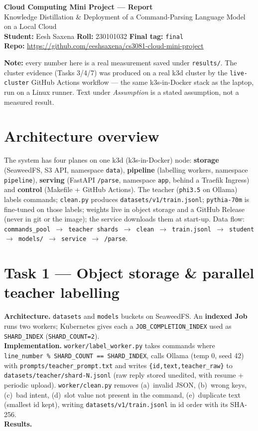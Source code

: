 \documentclass[10pt,a4paper]{article}
\newcommand{\code}[1]{\texttt{\small #1}}
\begin{document}
\begin{center}
  {\LARGE\bfseries Cloud Computing Mini Project --- Report}\\[2pt]
  {\normalsize Knowledge Distillation \& Deployment of a Command-Parsing Language Model on a Local Cloud}\\[6pt]
  \textbf{Student:} Eesh Saxena \quad\textbf{Roll:} 230101032 \quad\textbf{Final tag:} \code{final}\\[2pt]
  \textbf{Repo:} \url{https://github.com/eeshsaxena/cs3081-cloud-mini-project}
\end{center}

\noindent\colorbox{gray!12}{\parbox{\dimexpr\textwidth-2\fboxsep\relax}{\small
\textbf{Note:} every number here is a real measurement saved under \code{results/}. The cluster evidence
(Tasks 3/4/7) was produced on a real k3d cluster by the \code{live-cluster} GitHub Actions workflow --- the
same k3s-in-Docker stack as the laptop, run on a Linux runner. Text under \textit{Assumption} is a stated
assumption, not a measured result.}}

\section{Architecture overview}
The system has four planes on one k3d (k3s-in-Docker) node: \textbf{storage} (SeaweedFS, S3 API, namespace
\code{data}), \textbf{pipeline} (labelling workers, namespace \code{pipeline}), \textbf{serving} (FastAPI
\code{/parse}, namespace \code{app}, behind a Traefik Ingress) and \textbf{control} (Makefile + GitHub
Actions). The teacher (\code{phi3.5} on Ollama) labels commands; \code{clean.py} produces
\code{datasets/v1/train.jsonl}; \code{pythia-70m} is fine-tuned on those labels; weights live in object
storage and a GitHub Release (never in git or the image); the service downloads them at start-up. Data flow:
\code{commands\_pool $\rightarrow$ teacher shards $\rightarrow$ clean $\rightarrow$ train.jsonl $\rightarrow$
student $\rightarrow$ models/ $\rightarrow$ service $\rightarrow$ /parse}.

\section{Task 1 --- Object storage \& parallel teacher labelling}
\textbf{Architecture.} \code{datasets} and \code{models} buckets on SeaweedFS. An \textbf{indexed Job} runs
two workers; Kubernetes gives each a \code{JOB\_COMPLETION\_INDEX} used as \code{SHARD\_INDEX}
(\code{SHARD\_COUNT=2}).\\
\textbf{Implementation.} \code{worker/label\_worker.py} takes commands where
\code{line\_number \% SHARD\_COUNT == SHARD\_INDEX}, calls Ollama (temp 0, seed 42) with
\code{prompts/teacher\_prompt.txt} and writes \code{\{id,text,teacher\_raw\}} to
\code{datasets/teacher/shard-N.jsonl} (raw reply stored unedited, with resume + periodic upload).
\code{worker/clean.py} removes (a)~invalid JSON, (b)~wrong keys, (c)~bad intent, (d)~slot value not present
in the command, (e)~duplicate text (smallest id kept), writing \code{datasets/v1/train.jsonl} in id order
with its SHA-256.\\
\textbf{Results.}
\end{document}

